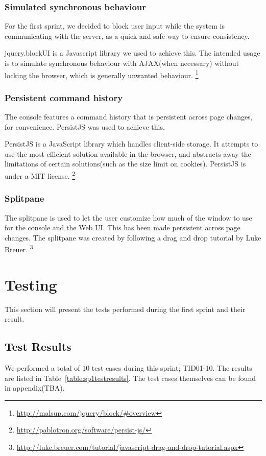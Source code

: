 \subsubsection{Simulated synchronous behaviour}
For the first sprint, we decided to block user input while the system is communicating with the server, as a quick and safe way to ensure consistency.

jquery.blockUI is a Javascript library we used to achieve this. The intended usage is to simulate synchronous behaviour with AJAX(when necessary) without locking the browser, which is generally unwanted behaviour.
\footnote{\url{http://malsup.com/jquery/block/\#overview}}

\subsubsection{Persistent command history}
The console features a command history that is persistent across page changes, for convenience. PersistJS was used to achieve this.

PersistJS is a JavaScript library which handles client-side storage. It attempts to use the most efficient solution available in the browser, and abstracts away the limitations of certain solutions(such as the size limit on cookies).
PersistJS is under a MIT license.
\footnote{\url{http://pablotron.org/software/persist-js/}}

\subsubsection{Splitpane}
The splitpane is used to let the user customize how much of the window to use for the console and the Web UI. This has been made persistent across page changes.
The splitpane was created by following a drag and drop tutorial by Luke Breuer.
\footnote{\url{http://luke.breuer.com/tutorial/javascript-drag-and-drop-tutorial.aspx}}



\section{Testing}
This section will present the tests performed during the first sprint and their result.

\subsection{Test Results}
We performed a total of 10 test cases during this sprint; TID01-10. The results are listed in Table~\ref{table:sp1testresults}. The test cases themselves can be found in appendix(TBA).

